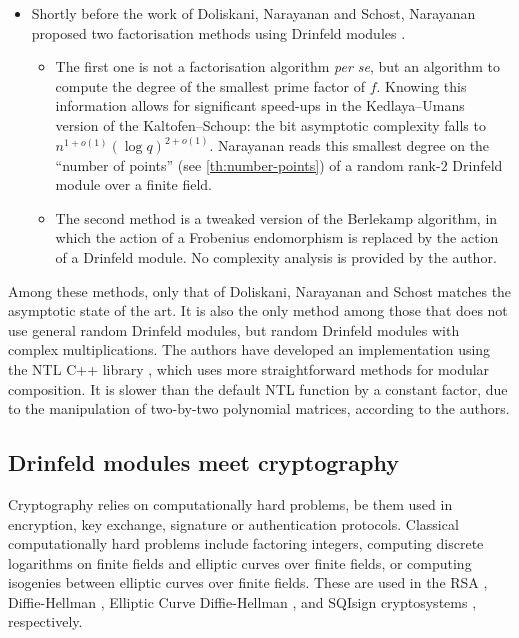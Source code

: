 \documentclass[11pt]{article}
\theoremstyle{definition}
\begin{document}
\begin{itemize}
  \item Shortly before the work of Doliskani, Narayanan and Schost, Narayanan
    proposed two factorisation methods using Drinfeld modules
    \cite{narayanan_polynomial_2018}.
    \begin{itemize}

      \item The first one is not a factorisation algorithm \emph{per se}, but an algorithm to compute the degree of the smallest prime factor of $f$.
        Knowing this information allows for significant speed-ups in the Kedlaya--Umans version of the Kaltofen--Schoup: the bit asymptotic
        complexity falls to $n^{1 + o(1)} (\log q)^{2 + o(1)}$.
        Narayanan reads
        this smallest degree on the ``number of points''
        (see \cref{th:number-points}) of a random rank-$2$ Drinfeld module
        over a finite field.
      \item The second method is a tweaked version of the Berlekamp algorithm, in which the action of a Frobenius endomorphism is replaced by the
        action of a Drinfeld module. No complexity analysis is provided by the author.
    \end{itemize}
\end{itemize}

Among these methods, only that of Doliskani, Narayanan and Schost
\cite{doliskani_drinfeld_2021} matches the asymptotic state of the art. It is also the only method among those that does not use general random Drinfeld
modules, but random Drinfeld modules with complex multiplications. The authors
have developed an implementation using the NTL C++ library \cite{NTL}, which uses more straightforward methods for modular composition. It is slower
than the default NTL function by a constant factor, due to the manipulation of
two-by-two polynomial matrices, according to the authors.


\subsection{Drinfeld modules meet cryptography}
\label{sub:crypto}

Cryptography relies on computationally hard problems, be them used in encryption, key exchange, signature or authentication protocols. Classical computationally hard problems include factoring integers, computing discrete
logarithms on finite fields and elliptic curves over finite fields, or
computing isogenies between elliptic curves over finite fields. These are used
in the RSA \cite{rivest_method_1978}, Diffie-Hellman \cite{diffie_new_1976},
Elliptic Curve Diffie-Hellman \cite{koblitz_elliptic_1987, miller_use_1986},
and SQIsign cryptosystems \cite{de_feo_sqisign_2020}, respectively.
\end{document}
